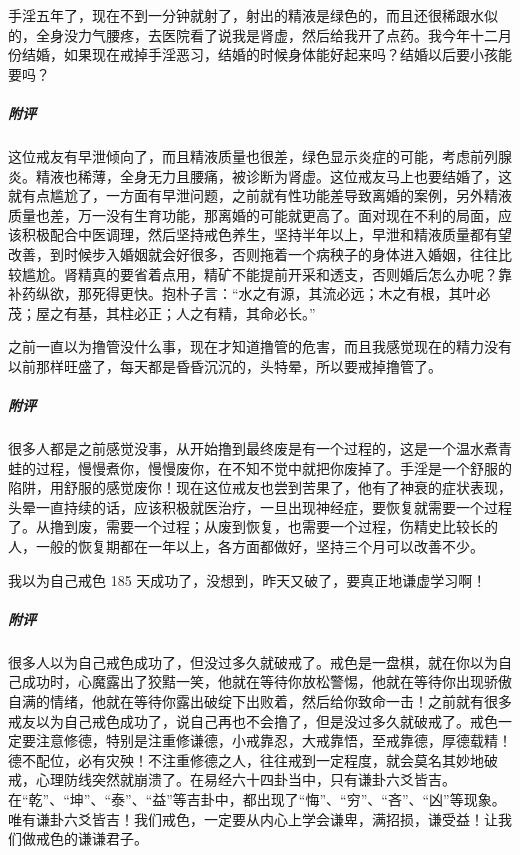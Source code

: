 \begin{case}
    手淫五年了，现在不到一分钟就射了，射出的精液是绿色的，而且还很稀跟水似的，全身没力气腰疼，去医院看了说我是肾虚，然后给我开了点药。我今年十二月份结婚，如果现在戒掉手淫恶习，结婚的时候身体能好起来吗？结婚以后要小孩能要吗？
    \subparagraph{附评} 这位戒友有早泄倾向了，而且精液质量也很差，绿色显示炎症的可能，考虑前列腺炎。精液也稀薄，全身无力且腰痛，被诊断为肾虚。这位戒友马上也要结婚了，这就有点尴尬了，一方面有早泄问题，之前就有性功能差导致离婚的案例，另外精液质量也差，万一没有生育功能，那离婚的可能就更高了。面对现在不利的局面，应该积极配合中医调理，然后坚持戒色养生，坚持半年以上，早泄和精液质量都有望改善，到时候步入婚姻就会好很多，否则拖着一个病秧子的身体进入婚姻，往往比较尴尬。肾精真的要省着点用，精矿不能提前开采和透支，否则婚后怎么办呢？靠补药纵欲，那死得更快。抱朴子言：“水之有源，其流必远；木之有根，其叶必茂；屋之有基，其柱必正；人之有精，其命必长。”
\end{case}

\begin{case}
    之前一直以为撸管没什么事，现在才知道撸管的危害，而且我感觉现在的精力没有以前那样旺盛了，每天都是昏昏沉沉的，头特晕，所以要戒掉撸管了。
    \subparagraph{附评} 很多人都是之前感觉没事，从开始撸到最终废是有一个过程的，这是一个温水煮青蛙的过程，慢慢煮你，慢慢废你，在不知不觉中就把你废掉了。手淫是一个舒服的陷阱，用舒服的感觉废你！现在这位戒友也尝到苦果了，他有了神衰的症状表现，头晕一直持续的话，应该积极就医治疗，一旦出现神经症，要恢复就需要一个过程了。从撸到废，需要一个过程；从废到恢复，也需要一个过程，伤精史比较长的人，一般的恢复期都在一年以上，各方面都做好，坚持三个月可以改善不少。
\end{case}

\begin{case}
    我以为自己戒色 185 天成功了，没想到，昨天又破了，要真正地谦虚学习啊！
    \subparagraph{附评} 很多人以为自己戒色成功了，但没过多久就破戒了。戒色是一盘棋，就在你以为自己成功时，心魔露出了狡黠一笑，他就在等待你放松警惕，他就在等待你出现骄傲自满的情绪，他就在等待你露出破绽下出败着，然后给你致命一击！之前就有很多戒友以为自己戒色成功了，说自己再也不会撸了，但是没过多久就破戒了。戒色一定要注意修德，特别是注重修谦德，小戒靠忍，大戒靠悟，至戒靠德，厚德载精！德不配位，必有灾殃！不注重修德之人，往往戒到一定程度，就会莫名其妙地破戒，心理防线突然就崩溃了。在易经六十四卦当中，只有谦卦六爻皆吉。在“乾”、“坤”、“泰”、“益”等吉卦中，都出现了“悔”、“穷”、“吝”、“凶”等现象。唯有谦卦六爻皆吉！我们戒色，一定要从内心上学会谦卑，满招损，谦受益！让我们做戒色的谦谦君子。
\end{case}

